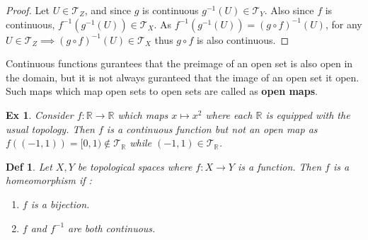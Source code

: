 \documentclass[paper=a4, fontsize=11pt]{scrartcl}
\newcommand{\T}{\mathcal{T}}
\newtheorem{definition}{Def}
\newtheorem{example}{Ex}
\begin{document}
\begin{proof}
	Let $U\in \T_Z$, and since $g$ is continuous $g^{-1}(U) \in \T_Y$. Also since $f$ is continuous, $f^{-1} \left( g^{-1}(U) \right) \in \T_X$. As $f^{-1} \left( g^{-1}(U) \right) = (g\circ f)^{-1}(U)$, for any $U\in \T_Z \implies (g\circ f)^{-1}(U) \in \T_X$ thus $g\circ f$ is also continuous.
\end{proof}

\vspace{0.15in}

Continuous functions gurantees that the preimage of an open set is also open in the domain, but it is not always guranteed that the image of an open set it open. Such maps which map open sets to open sets are called as \textbf{open maps}.\\

\begin{example}
	Consider $f:\mathbb{R}\to \mathbb{R}$ which maps $x\mapsto x^2$ where each $\mathbb{R}$ is equipped with the usual topology. Then $f$ is a continuous function but not an open map as $f((-1,1))=[0,1)\not\in \T_\mathbb{R}$ while $(-1,1) \in \T_\mathbb{R}$.
\end{example}

\vspace{0.15in}

\begin{definition}
	Let $X,Y$ be topological spaces where $f:X\to Y$ is a function. Then $f$ is a homeomorphism if : 
	\begin{enumerate}[label=\arabic*)]
		\item $f$ is a bijection.
		\item $f$ and $f^{-1}$ are both continuous.
	\end{enumerate}
\end{definition}
\end{document}

